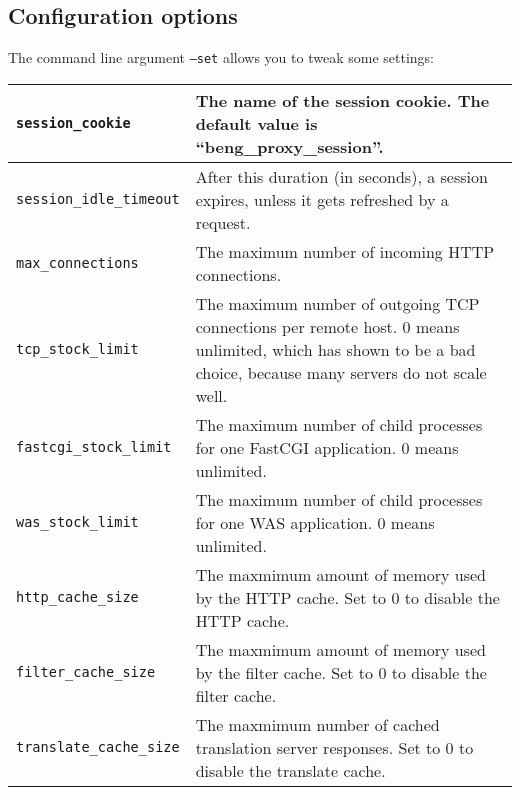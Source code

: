 \documentclass[a4paper,12pt]{article}
\begin{document}
\subsection{Configuration options}

The command line argument \texttt{--set} allows you to tweak some
settings:

\begin{longtable}{|l|p{8cm}|}
\hline

\verb|session_cookie| & The name of the session cookie.  The
default value is ``beng\_proxy\_session''. \\ \hline

\verb|session_idle_timeout| & After this duration (in seconds), a
session expires, unless it gets refreshed by a request. \\

\hline

\verb|max_connections| & The maximum number of incoming HTTP
connections. \\
\hline

\verb|tcp_stock_limit| & The maximum number of outgoing TCP
connections per remote host.  0 means unlimited, which has shown to be
a bad choice, because many servers do not scale well. \\

\hline

\verb|fastcgi_stock_limit| & The maximum number of child processes
for one FastCGI application.  0 means unlimited. \\

\hline

\verb|was_stock_limit| & The maximum number of child processes for
one WAS application.  0 means unlimited. \\

\hline

\verb|http_cache_size| & The maxmimum amount of memory used by the
HTTP cache.  Set to 0 to disable the HTTP cache. \\

\hline

\verb|filter_cache_size| & The maxmimum amount of memory used by
the filter cache.  Set to 0 to disable the filter cache. \\

\hline

\verb|translate_cache_size| & The maxmimum number of cached
translation server responses.  Set to 0 to disable the translate
cache. \\


\end{longtable}
\end{document}
